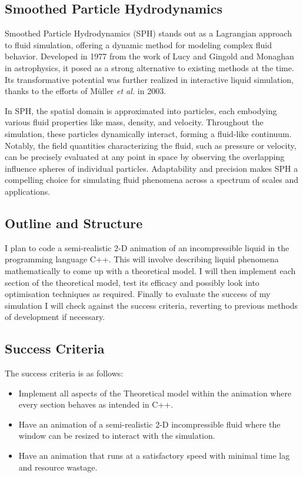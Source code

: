 \documentclass[write-up.tex]{subfiles}
\begin{document}
\subsection{Smoothed Particle Hydrodynamics}
Smoothed Particle Hydrodynamics (SPH) stands out as a Lagrangian approach to fluid simulation, offering a dynamic method for modeling complex fluid behavior. Developed in 1977 from the work of Lucy \cite{lucy} and Gingold and Monaghan \cite{gingold} in astrophysics, it posed as a strong alternative to existing methods at the time. Its transformative potential was further realized in interactive liquid simulation, thanks to the efforts of Müller \textit{et al.} \cite{muller} in 2003.

In SPH, the spatial domain is approximated into particles, each embodying various fluid properties like mass, density, and velocity. Throughout the simulation, these particles dynamically interact, forming a fluid-like continuum. Notably, the field quantities characterizing the fluid, such as pressure or velocity, can be precisely evaluated at any point in space by observing the overlapping influence spheres of individual particles. Adaptability and precision makes SPH a compelling choice for simulating fluid phenomena across a spectrum of scales and applications.

\subsection{Outline and Structure}
I plan to code a semi-realistic 2-D animation of an incompressible liquid in the programming language C++. This will involve describing liquid phenomena mathematically to come up with a theoretical model. I will then implement each section of the theoretical model, test its efficacy and possibly look into optimisation techniques as required. Finally to evaluate the success of my simulation I will check against the success criteria, reverting to previous methods of development if necessary.

\subsection{Success Criteria}
The success criteria is as follows:
\begin{itemize}
 \item Implement all aspects of the Theoretical model within the animation where every section behaves as intended in C++.
 \item Have an animation of a semi-realistic 2-D incompressible fluid where the window can be resized to interact with the simulation.
 \item Have an animation that runs at a satisfactory speed with minimal time lag and resource wastage.
\end{itemize}
\end{document}
